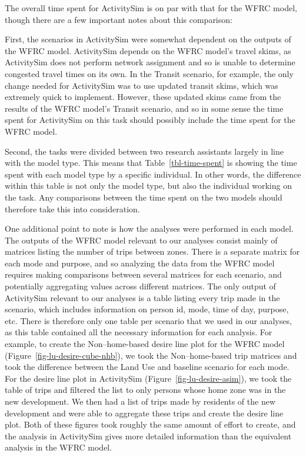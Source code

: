 \documentclass[fancy, twoside, mastersfancy, ms]{byuthesis}
\begin{document}
The overall time spent for ActivitySim is on par with that for the WFRC
model, though there are a few important notes about this comparison:

First, the scenarios in ActivitySim were somewhat dependent on the
outputs of the WFRC model. ActivitySim depends on the WFRC model's
travel skims, as ActivitySim does not perform network assignment and so
is unable to determine congested travel times on its own. In the Transit
scenario, for example, the only change needed for ActivitySim was to use
updated transit skims, which was extremely quick to implement. However,
these updated skims came from the results of the WFRC model's Transit
scenario, and so in some sense the time spent for ActivitySim on this
task should possibly include the time spent for the WFRC model.

Second, the tasks were divided between two research assistants largely
in line with the model type. This means that Table~\ref{tbl-time-spent}
is showing the time spent with each model type by a specific individual.
In other words, the difference within this table is not only the model
type, but also the individual working on the task. Any comparisons
between the time spent on the two models should therefore take this into
consideration.

One additional point to note is how the analyses were performed in each
model. The outputs of the WFRC model relevant to our analyses consist
mainly of matrices listing the number of trips between zones. There is a
separate matrix for each mode and purpose, and so analyzing the data
from the WFRC model requires making comparisons between several matrices
for each scenario, and potentially aggregating values across different
matrices. The only output of ActivitySim relevant to our analyses is a
table listing every trip made in the scenario, which includes
information on person id, mode, time of day, purpose, etc. There is
therefore only one table per scenario that we used in our analyses, as
this table contained all the necessary information for each analysis.
For example, to create the Non--home-based desire line plot for the WFRC
model (Figure~\ref{fig-lu-desire-cube-nhb}), we took the Non--home-based
trip matrices and took the difference between the Land Use and baseline
scenario for each mode. For the desire line plot in ActivitySim
(Figure~\ref{fig-lu-desire-asim}), we took the table of trips and
filtered the list to only persons whose home zone was in the new
development. We then had a list of trips made by residents of the new
development and were able to aggregate these trips and create the desire
line plot. Both of these figures took roughly the same amount of effort
to create, and the analysis in ActivitySim gives more detailed
information than the equivalent analysis in the WFRC model.
\end{document}
